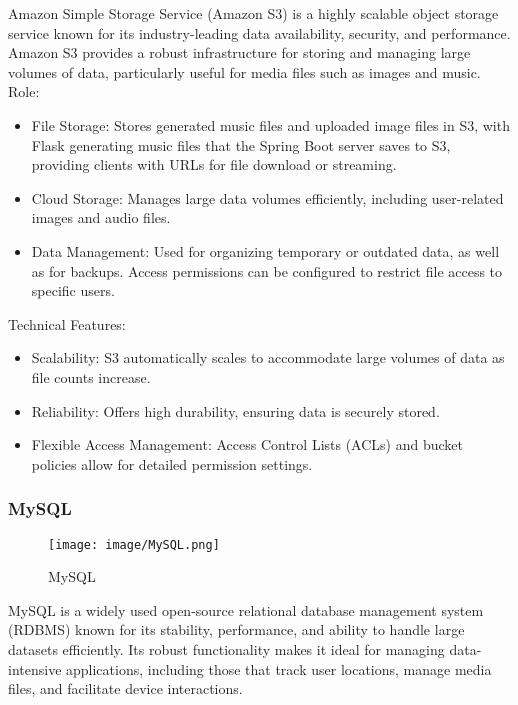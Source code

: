 \documentclass[conference]{IEEEtran}
\begin{document}
\noindent Amazon Simple Storage Service (Amazon S3) is a highly scalable object storage service known for its industry-leading data availability, security, and performance. Amazon S3 provides a robust infrastructure for storing and managing large volumes of data, particularly useful for media files such as images and music.\\

Role:
\begin{itemize}
    \item File Storage: Stores generated music files and uploaded image files in S3, with Flask generating music files that the Spring Boot server saves to S3, providing clients with URLs for file download or streaming.\\
    \item Cloud Storage: Manages large data volumes efficiently, including user-related images and audio files.\\
    \item Data Management: Used for organizing temporary or outdated data, as well as for backups. Access permissions can be configured to restrict file access to specific users.\\
\end{itemize}

Technical Features:
\begin{itemize}
    \item Scalability: S3 automatically scales to accommodate large volumes of data as file counts increase.\\
    \item Reliability: Offers high durability, ensuring data is securely stored.\\
    \item Flexible Access Management: Access Control Lists (ACLs) and bucket policies allow for detailed permission settings.\\
\end{itemize}

\subsubsection{MySQL}

\begin{figure}[h!]
    \centering
    \texttt{[image: image/MySQL.png]}
    \caption{MySQL}
    \label{fig:enter-label}
\end{figure}

\noindent MySQL is a widely used open-source relational database management system (RDBMS) known for its stability, performance, and ability to handle large datasets efficiently. Its robust functionality makes it ideal for managing data-intensive applications, including those that track user locations, manage media files, and facilitate device interactions.\\
\end{document}
